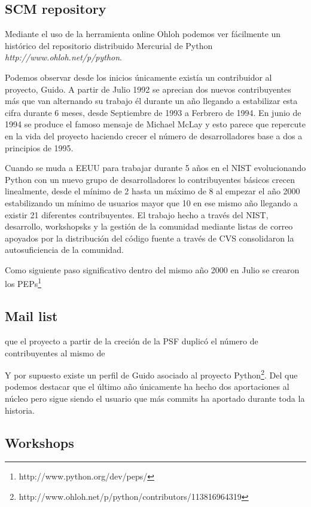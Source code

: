 \documentclass[11pt]{scrartcl}
\begin{document}
\subsection{SCM repository}

Mediante el uso de la herramienta online Ohloh podemos ver fácilmente un histórico del repositorio distribuido Mercurial de Python \emph{http://www.ohloh.net/p/python}.

Podemos observar desde los inicios únicamente existía un contribuidor al proyecto, Guido. A partir de Julio 1992 se aprecian dos nuevos contribuyentes más que van alternando su trabajo él durante un año llegando a estabilizar esta cifra durante 6 meses, desde Septiembre de 1993 a Ferbrero de 1994. En junio de 1994 se produce el famoso mensaje de Michael McLay y esto parece que repercute en la vida del proyecto haciendo crecer el número de desarrolladores base a dos a principios de 1995. 

Cuando se muda a EEUU para trabajar durante 5 años en el NIST evolucionando Python con un nuevo grupo de desarrolladores lo contribuyentes básicos crecen linealmente, desde el mínimo de 2 hasta un máximo de 8 al empezar el año 2000 estabilizando un mínimo de usuarios mayor que 10 en ese mismo año llegando a existir 21 diferentes contribuyentes. El trabajo hecho a través del NIST, desarrollo, workshopsks y la gestión de la comunidad mediante listas de correo apoyados por la distribución del código fuente a través de CVS consolidaron la autosuficiencia de la comunidad.

Como siguiente paso significativo dentro del mismo año 2000 en Julio se crearon los PEPs\footnote{http://www.python.org/dev/peps/}


\subsection{Mail list}

que el proyecto a partir de la creción de la PSF duplicó el número de contribuyentes al mismo de 

Y por supuesto existe un perfil de Guido asociado al proyecto Python\footnote{http://www.ohloh.net/p/python/contributors/113816964319}. Del que podemos destacar que el último año únicamente ha hecho dos aportaciones al núcleo pero sigue siendo el usuario que más commits ha aportado durante toda la historia.

\subsection{Workshops}
\end{document}
